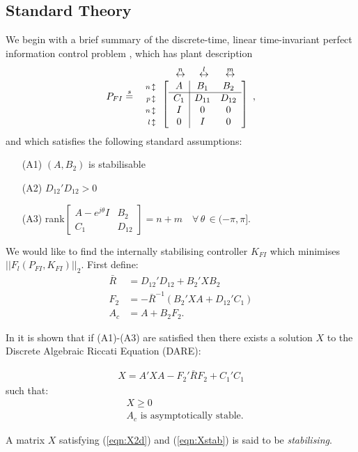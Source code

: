 \documentclass[a4paper,12pt]{article}
\theoremstyle{remark}
\newcommand{\arr}[2]{
        \begin{array}{#1}
        #2
        \end{array}}
\newcommand{\shorteq}{\stackrel{s}{=}}
\newcommand{\nrm}[1]{\left|\left| #1 \right|\right|}
\newcommand{\ma}[1]{\begin{bmatrix} #1 \end{bmatrix}}
\newcommand{\aln}[1]{\begin{align} #1 \end{align}}
\begin{document}
\subsection{Standard Theory}
\label{subsec:stdH2FI}
We begin with a brief summary of the discrete-time, linear time-invariant perfect information control problem \cite{LimebeerGreen}, which has plant description
$$P_{FI} \shorteq \arr{c}{\hspace{0.8cm}\stackrel{n}{\leftrightarrow}\hspace{0.5cm}\stackrel{l}{\leftrightarrow}\hspace{0.6cm}\stackrel{m}{\leftrightarrow} \\\arr{r}{\scriptstyle{n} \,\updownarrow\\\scriptstyle{p} \,\updownarrow\\\scriptstyle{n} \,\updownarrow\\\scriptstyle{l} \,\updownarrow} \ma{\arr{c|cc}{ A&B_1&B_2\\\hline C_1&D_{11}&D_{12}\\I&0&0\\0&I&0}}},$$and which satisfies the following standard assumptions:
\begin{itemize}
\item[(A1)] $(A,B_2)$ is stabilisable 
\item[(A2)] $D_{12}'D_{12}>0$
\item[(A3)] rank$\ma{A-e^{j\theta}I&B_2\\C_1& D_{12}}=n+m \quad \forall\, \theta \,\in (-\pi,\pi]$.
\end{itemize}

We would like to find the internally stabilising controller $K_{FI}$ which minimises $\nrm{F_l(P_{FI},K_{FI})}_2$. First define:
\aln{
\bar R&=D_{12}'D_{12}+B_2'XB_2   \\
  F_2&=-{\bar R}^{-1}(B_2'XA+D_{12}'C_1)  \label{eqn:F2Def}\\
A_c&=A+B_2F_2.
}

In \cite{ZDG} it is shown that if (A1)-(A3) are satisfied then there exists a solution $X$ to the Discrete Algebraic Riccati Equation (DARE):

\aln{X=A'XA-F_2'{\bar R}F_2+C_1'C_1 \label{eqn:X2d}}
such that:
\aln{
&X\geq 0 \label{eqn:Xpos}\\
&A_c \,\, \textrm{is asymptotically stable} \label{eqn:Xstab}
.}

A matrix $X$ satisfying (\ref{eqn:X2d}) and (\ref{eqn:Xstab}) is said to be \textit{stabilising}.
\end{document}
